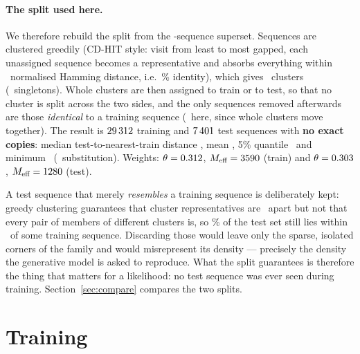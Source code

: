 \documentclass[10pt,a4paper]{article}
\begin{document}
\begin{table}[h]\centering\small

\caption{The supplied bacterial J-domain files. The last two columns are the fraction of a
file's \emph{unique} sequences that also appear in \texttt{filtered} and in \texttt{train2}.}
\label{tab:audit}
\end{table}

\paragraph{The split used here.} We therefore rebuild the split from the \NsuperSet-sequence
superset. Sequences are clustered greedily (CD-HIT style: visit from least to most gapped, each
unassigned sequence becomes a representative and absorbs everything within \SplitThresh\
normalised Hamming distance, i.e.\ \SplitIdent\% identity), which gives \NclustTot\ clusters
(\NsingleClust\ singletons). Whole clusters are then assigned to train or to test, so that no
cluster is split across the two sides, and the only sequences removed afterwards are those
\emph{identical} to a training sequence (\NdropClean\ here, since whole clusters move together).
The result is $29\,312$ training and $7\,401$ test sequences with \textbf{no exact copies}:
median test-to-nearest-train distance \CleanNNmed, mean \CleanNN, 5\% quantile \CleanNNqfive\ and
minimum \CleanNNmin\ (\CleanNNminSub\ substitution). Weights: $\theta=0.312$,
$M_\text{eff}=3590$ (train) and $\theta=0.303$, $M_\text{eff}=1280$ (test).

A test sequence that merely \emph{resembles} a training sequence is deliberately kept: greedy
clustering guarantees that cluster representatives are \SplitThresh\ apart but not that every
pair of members of different clusters is, so \CleanPctNear\% of the test set still lies within
\SplitThresh\ of some training sequence. Discarding those would leave only the sparse, isolated
corners of the family and would misrepresent its density --- precisely the density the generative
model is asked to reproduce. What the split guarantees is therefore the thing that matters for a
likelihood: no test sequence was ever seen during training.
Section~\ref{sec:compare} compares the two splits.

\section{Training}
\end{document}
